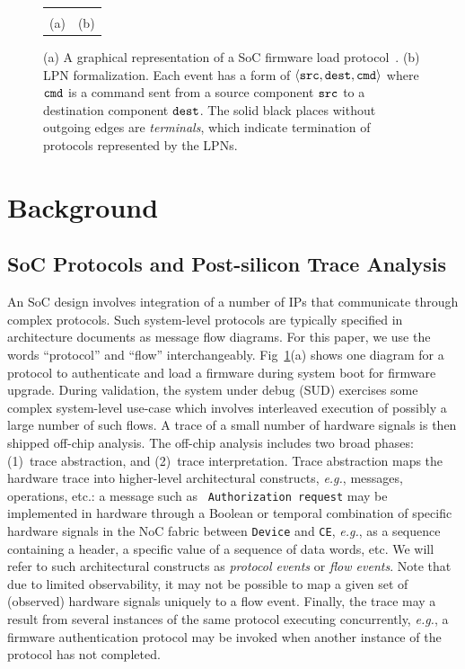 \documentclass[conference]{IEEEtran}
\newcommand{\eg}{\mbox{{\em e.g.}}}
\begin{document}
\begin{figure}[tb]
\begin{center}
\begin{tabular}{cc}
\begin{minipage}{3in}
{\begin{tikzpicture}[node distance=3cm, auto,>=latex', thick]
\end{tikzpicture}
}
\end{minipage}
\\
(a) & (b)
\end{tabular}
\caption{(a) A graphical representation of a SoC firmware
  load protocol~\cite{Krstic14HOST}.  (b) LPN formalization.
  Each event has a form of $\langle {\tt src, dest, cmd}
  \rangle$ where ${\tt cmd}$ is a command sent from a source
  component ${\tt src}$ to a destination component ${\tt
    dest}$. The solid black places without outgoing edges
  are {\em terminals}, which indicate termination of
  protocols represented by the LPNs.}
\label{flow-spec-ex}
\end{center}
\end{figure}


\section{Background}

\subsection{SoC Protocols and Post-silicon Trace Analysis}

An SoC design involves integration of a number of IPs that
communicate through complex protocols.  Such system-level
protocols are typically specified in architecture documents
as message flow diagrams.  For this paper, we use the words
``protocol'' and ``flow'' interchangeably.
Fig~\ref{flow-spec-ex}(a) shows one diagram for a protocol
to authenticate and load a firmware during system boot for
firmware upgrade.  During validation, the system under debug
(SUD) exercises some complex system-level use-case which
involves interleaved execution of possibly a large number of
such flows.  A trace of a small number of hardware signals
is then shipped off-chip analysis.  The off-chip analysis
includes two broad phases: (1)~trace abstraction, and
(2)~trace interpretation.  Trace abstraction maps the
hardware trace into higher-level architectural constructs,
\eg, messages, operations, etc.: a message such as {\tt
  Authorization request} may be implemented in hardware
through a Boolean or temporal combination of specific
hardware signals in the NoC fabric between {\tt Device} and
{\tt CE}, \eg, as a sequence containing a header, a specific
value of a sequence of data words, etc.  We will refer to
such architectural constructs as {\em protocol events} or
{\em flow events}.  Note that due to limited observability,
it may not be possible to map a given set of (observed)
hardware signals uniquely to a flow event.  Finally, the
trace may a result from several instances of the same
protocol executing concurrently, \eg, a firmware
authentication protocol may be invoked when another instance
of the protocol has not completed.
\end{document}
